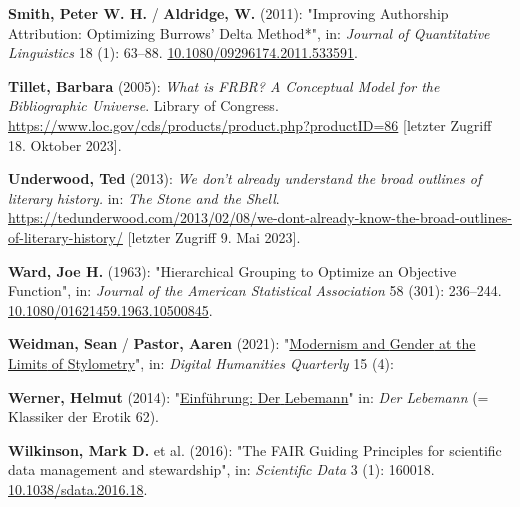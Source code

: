 \documentclass[
  12pt,
  letterpaper,
  DIV=11,
  numbers=noendperiod]{scrreprt}
\newlength{\cslhangindent}
\newenvironment{CSLReferences}[2] %
 {\begin{list}{}{%
  \setlength{\itemindent}{0pt}
  \setlength{\leftmargin}{0pt}
  \setlength{\parsep}{0pt}
  \ifodd #1
   \setlength{\leftmargin}{\cslhangindent}
   \setlength{\itemindent}{-1\cslhangindent}
  \fi
  \setlength{\itemsep}{#2\baselineskip}}}
 {\end{list}}
\begin{document}
\begin{CSLReferences}{1}{0}
\textbf{Smith, Peter W. H.} / \textbf{Aldridge, W.} (2011): "Improving
{Authorship} {Attribution}: {Optimizing} {Burrows}' {Delta} {Method}*",
in: \emph{Journal of Quantitative Linguistics} 18 (1): 63--88.
\href{https://doi.org/10.1080/09296174.2011.533591}{10.1080/09296174.2011.533591}.

\textbf{Tillet, Barbara} (2005): \emph{What is {FRBR}? {A} {Conceptual}
{Model} for the {Bibliographic} {Universe}}. Library of Congress.
\url{https://www.loc.gov/cds/products/product.php?productID=86}
{[}letzter Zugriff 18. Oktober 2023{]}.

\textbf{Underwood, Ted} (2013): \emph{We don't already understand the
broad outlines of literary history.} in: \emph{The Stone and the Shell}.
\url{https://tedunderwood.com/2013/02/08/we-dont-already-know-the-broad-outlines-of-literary-history/}
{[}letzter Zugriff 9. Mai 2023{]}.

\textbf{Ward, Joe H.} (1963): "Hierarchical {Grouping} to {Optimize} an
{Objective} {Function}", in: \emph{Journal of the American Statistical
Association} 58 (301): 236--244.
\href{https://doi.org/10.1080/01621459.1963.10500845}{10.1080/01621459.1963.10500845}.

\textbf{Weidman, Sean} / \textbf{Pastor, Aaren} (2021):
"\href{https://www.digitalhumanities.org/dhq/vol/15/4/000566/000566.html}{Modernism
and {Gender} at the {Limits} of {Stylometry}}", in: \emph{Digital
Humanities Quarterly} 15 (4):

\textbf{Werner, Helmut} (2014):
"\href{https://seyerlein.de/shop/item/9783944964744/klassiker-der-erotik-62-der-lebemann-von-andrea-de-nerciat-e-book-epub}{Einführung:
{Der} {Lebemann}}" in: \emph{Der {Lebemann}} (= Klassiker der {Erotik}
62).

\textbf{Wilkinson, Mark D.} et al. (2016): "The {FAIR} {Guiding}
{Principles} for scientific data management and stewardship", in:
\emph{Scientific Data} 3 (1): 160018.
\href{https://doi.org/10.1038/sdata.2016.18}{10.1038/sdata.2016.18}.

\end{CSLReferences}



\printindex
\end{document}
